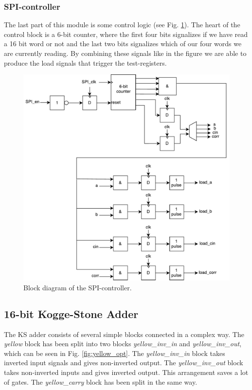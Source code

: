 \subsubsection{SPI-controller}
The last part of this module is some control logic (see Fig. \ref{fig:spi_controller}). The heart of the control block is a 6-bit counter, where the first four bits signalizes if we have read a 16 bit word or not and the last two bits signalizes which of our four words we are currently reading. By combining these signals like in the figure we are able to produce the load signals that trigger the test-registers.

\begin{figure}[H]
	\centering
	\captionsetup{justification=centering}
	\includegraphics[scale=0.5]{../figures/SPI_controller.pdf}
	\caption{Block diagram of the SPI-controller.} \label{fig:spi_controller}
\end{figure}

\subsection{16-bit Kogge-Stone Adder}
The KS adder consists of several simple blocks connected in a complex way. The \textit{yellow} block has been split into two blocks \textit{yellow\_inv\_in} and \textit{yellow\_inv\_out}, which can be seen in Fig. \ref{fig:yellow_opt}. The \textit{yellow\_inv\_in} block takes inverted input signals and gives non-inverted output. The \textit{yellow\_inv\_out} block takes non-inverted inputs and gives inverted output. This arrangement saves a lot of gates. The \textit{yellow\_carry} block has been split in the same way. 

